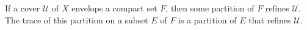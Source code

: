 If a cover $\mathcal{U}$ of $X$ envelops a compact set $F$, then some partition of $F$ refines $\mathcal{U}$. The trace of this partition on a subset $E$ of $F$ is a partition of $E$ that refines $\mathcal{U}$.
